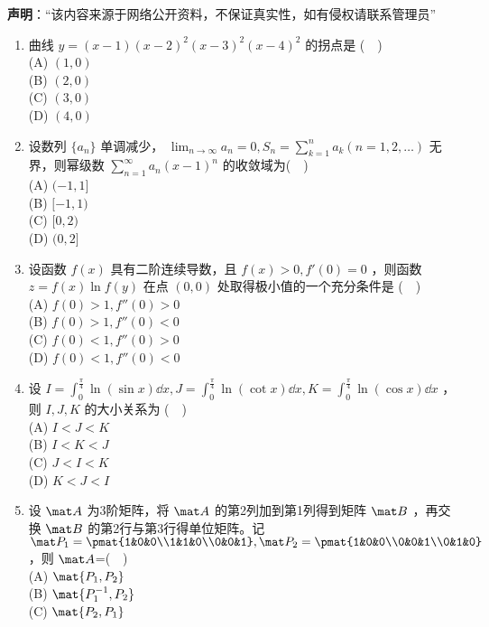 
\textbf{声明}：“该内容来源于网络公开资料，不保证真实性，如有侵权请联系管理员”

\begin{enumerate}
\item 曲线 $y=(x-1)(x-2)^2(x-3)^2(x-4)^2$ 的拐点是  ($\quad$)\\
(A) $(1,0)$\\
(B) $(2,0)$\\
(C) $(3,0)$\\
(D) $(4,0)$
\item 设数列 $\{a_n\}$ 单调减少， $\displaystyle \lim_{n\to\infty} a_n=0,S_n=\sum_{k=1}^{n}a_k(n=1,2,\dots)$  无界，则幂级数 $\displaystyle \sum_{n=1}^\infty a_n(x-1)^n$ 的收敛域为($\quad$)\\
(A) $(-1,1]$\\
(B) $[-1,1)$\\
(C) $[0,2)$\\
(D) $(0,2]$
\item  设函数 $f(x)$ 具有二阶连续导数，且 $f(x)>0,f'(0)=0$  ，则函数  $z=f(x)\ln f(y)$ 在点 $(0,0)$ 处取得极小值的一个充分条件是 ($\quad$)\\
(A) $f(0)>1,f''(0)>0$\\
(B) $f(0)>1,f''(0)<0$\\
(C) $f(0)<1,f''(0)>0$\\
(D) $f(0)<1,f''(0)<0$
\item 设 $\displaystyle I=\int_{0}^{\frac{\pi}{4}}\ln (\sin x)\dd{x},J=\int_{0}^{\frac{\pi}{4}}\ln (\cot x)\dd{x},K=\int_{0}^{\frac{\pi}{4}}\ln (\cos x)\dd{x}$ ，则 $I,J,K$ 的大小关系为 ($\quad$)\\
(A) $I<J<K$\\
(B) $I<K<J$\\
(C) $J<I<K$\\
(D) $K<J<I$
\item 设 $\mat A$ 为3阶矩阵，将 $\mat A$ 的第2列加到第1列得到矩阵 $\mat B$ ，再交换 $\mat B$ 的第2行与第3行得单位矩阵。记 $\mat P_1=\pmat{1&0&0\\1&1&0\\0&0&1},\mat P_2=\pmat{1&0&0\\0&0&1\\0&1&0}$ ，则 $\mat A$=($\quad$)\\
(A) $\mat {P_1,P_2}$\\
(B) $\mat {P_1^{-1},P_2}$\\
(C) $\mat {P_2,P_1}$\\

\end{enumerate}
